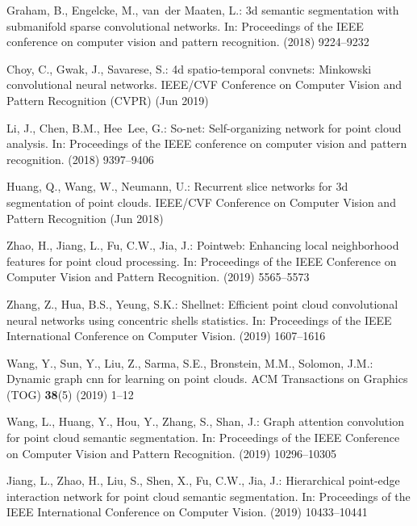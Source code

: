 \documentclass[runningheads]{llncs}
\begin{document}
\begin{thebibliography}{10}
Graham, B., Engelcke, M., van~der Maaten, L.:
\newblock 3d semantic segmentation with submanifold sparse convolutional
  networks.
\newblock In: Proceedings of the IEEE conference on computer vision and pattern
  recognition. (2018)  9224--9232

Choy, C., Gwak, J., Savarese, S.:
\newblock 4d spatio-temporal convnets: Minkowski convolutional neural networks.
 IEEE/CVF Conference on Computer Vision and Pattern Recognition
  (CVPR) (Jun 2019)

Li, J., Chen, B.M., Hee~Lee, G.:
\newblock So-net: Self-organizing network for point cloud analysis.
\newblock In: Proceedings of the IEEE conference on computer vision and pattern
  recognition. (2018)  9397--9406

Huang, Q., Wang, W., Neumann, U.:
\newblock Recurrent slice networks for 3d segmentation of point clouds.
 IEEE/CVF Conference on Computer Vision and Pattern Recognition
  (Jun 2018)

Zhao, H., Jiang, L., Fu, C.W., Jia, J.:
\newblock Pointweb: Enhancing local neighborhood features for point cloud
  processing.
\newblock In: Proceedings of the IEEE Conference on Computer Vision and Pattern
  Recognition. (2019)  5565--5573

Zhang, Z., Hua, B.S., Yeung, S.K.:
\newblock Shellnet: Efficient point cloud convolutional neural networks using
  concentric shells statistics.
\newblock In: Proceedings of the IEEE International Conference on Computer
  Vision. (2019)  1607--1616

Wang, Y., Sun, Y., Liu, Z., Sarma, S.E., Bronstein, M.M., Solomon, J.M.:
\newblock Dynamic graph cnn for learning on point clouds.
\newblock ACM Transactions on Graphics (TOG) \textbf{38}(5) (2019)  1--12

Wang, L., Huang, Y., Hou, Y., Zhang, S., Shan, J.:
\newblock Graph attention convolution for point cloud semantic segmentation.
\newblock In: Proceedings of the IEEE Conference on Computer Vision and Pattern
  Recognition. (2019)  10296--10305

Jiang, L., Zhao, H., Liu, S., Shen, X., Fu, C.W., Jia, J.:
\newblock Hierarchical point-edge interaction network for point cloud semantic
  segmentation.
\newblock In: Proceedings of the IEEE International Conference on Computer
  Vision. (2019)  10433--10441


\end{thebibliography}
\end{document}

